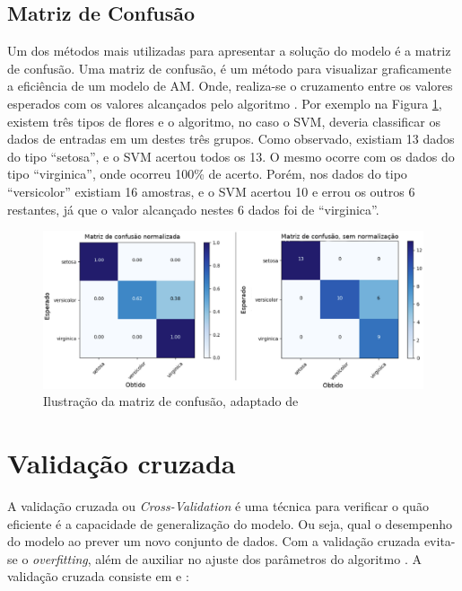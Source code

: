 \subsection{Matriz de Confusão}
\label{sc:matrizconsusao}
Um dos métodos mais utilizadas para apresentar a solução do modelo é a matriz de confusão. Uma matriz de confusão, é um método para visualizar graficamente a eficiência de um modelo de AM. Onde, realiza-se o cruzamento entre os valores esperados com os valores alcançados pelo algoritmo \cite{caelen2017bayesian}. Por exemplo na Figura \ref{matriz_consusao}, existem três tipos de flores e o algoritmo, no caso o SVM, deveria classificar os dados de entradas em um destes três grupos. Como observado, existiam 13 dados do tipo “setosa”, e o SVM acertou todos os 13. O mesmo ocorre com os dados do tipo “virginica”, onde ocorreu 100\% de acerto. Porém, nos dados do tipo “versicolor” existiam 16 amostras, e o SVM acertou 10 e errou os outros 6 restantes, já que o valor alcançado nestes 6 dados foi de “virginica”.

\begin{figure}[!htb]
	\centering
    \includegraphics[width=1.1\textwidth]{figuras/ma_normalizedy.eps}
    \caption{Ilustração da matriz de confusão, adaptado de \cite{scikitlearn}}
	\label{matriz_consusao}
\end{figure}

\section{Validação cruzada}
\label{sc:crossvalidation}
A validação cruzada ou \textit{Cross-Validation} é uma técnica para verificar o quão eficiente é a capacidade de generalização do modelo. Ou seja, qual o desempenho do modelo ao prever um novo conjunto de dados. Com a validação cruzada evita-se o \textit{overfitting}, além de auxiliar no ajuste dos parâmetros do algoritmo \cite{james2013introduction}. A validação cruzada consiste em \cite{james2013introduction} e \cite{raschka2015python}:

